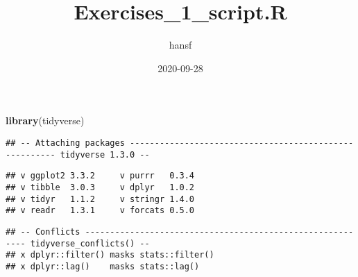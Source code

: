 \documentclass[
]{article}
\title{Exercises\_1\_script.R}
\author{hansf}
\date{2020-09-28}
\newenvironment{Shaded}{\begin{snugshade}}{\end{snugshade}}
\newcommand{\CommentTok}[1]{\textcolor[rgb]{0.56,0.35,0.01}{\textit{#1}}}
\newcommand{\DataTypeTok}[1]{\textcolor[rgb]{0.13,0.29,0.53}{#1}}
\newcommand{\KeywordTok}[1]{\textcolor[rgb]{0.13,0.29,0.53}{\textbf{#1}}}
\newcommand{\NormalTok}[1]{#1}
\newcommand{\OperatorTok}[1]{\textcolor[rgb]{0.81,0.36,0.00}{\textbf{#1}}}
\newcommand{\StringTok}[1]{\textcolor[rgb]{0.31,0.60,0.02}{#1}}
\begin{document}
\maketitle

\begin{Shaded}
\begin{Highlighting}[]
\KeywordTok{library}\NormalTok{(tidyverse)}
\end{Highlighting}
\end{Shaded}

\begin{verbatim}
## -- Attaching packages ------------------------------------------------------- tidyverse 1.3.0 --
\end{verbatim}

\begin{verbatim}
## v ggplot2 3.3.2     v purrr   0.3.4
## v tibble  3.0.3     v dplyr   1.0.2
## v tidyr   1.1.2     v stringr 1.4.0
## v readr   1.3.1     v forcats 0.5.0
\end{verbatim}

\begin{verbatim}
## -- Conflicts ---------------------------------------------------------- tidyverse_conflicts() --
## x dplyr::filter() masks stats::filter()
## x dplyr::lag()    masks stats::lag()
\end{verbatim}

\begin{Shaded}
\end{Shaded}
\end{document}
